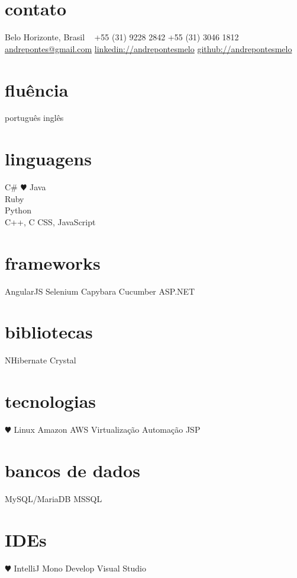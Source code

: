\documentclass[]{friggeri-cv}
\begin{document}


\begin{aside} 
\section{contato}
Belo Horizonte, Brasil
~
+55 (31) 9228 2842
+55 (31) 3046 1812
~
\href{mailto:andrepontes@gmail.com}{andrepontes@gmail.com}
\href{https://br.linkedin.com/in/andrepontesmelo}{linkedin://andrepontesmelo}
\href{https://github.com/andrepontesmelo}{github://andrepontesmelo}
\section{fluência}
português
inglês 
\section{linguagens}
C\#
 {\color{red} $\varheartsuit$} Java\\Ruby\\Python\\C++, C
CSS, JavaScript
\section{frameworks}
AngularJS
Selenium
Capybara
Cucumber 
ASP.NET
\section{bibliotecas}
NHibernate
Crystal
\section{tecnologias}
 {\color{red} $\varheartsuit$} Linux
Amazon AWS
Virtualização
Automação
JSP
\section{bancos de dados}
MySQL/MariaDB
MSSQL
\section{IDEs}
 {\color{red} $\varheartsuit$} IntelliJ
Mono Develop
Visual Studio
\end{aside}
\end{document}
